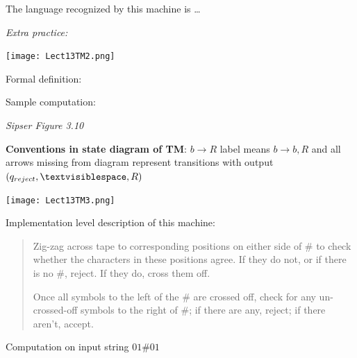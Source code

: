 \documentclass[12pt, oneside]{article}
\begin{document}
\vfill

The language recognized by this machine is \ldots

{\it Extra practice:}

 \texttt{[image: Lect13TM2.png]} 


 Formal definition: 


 Sample computation: 
 

\newpage
{\it Sipser Figure  3.10}

{\bf Conventions in state diagram of TM}: $b \to R$ label means $b \to b, R$ and
all arrows missing from diagram represent transitions with output $(q_{reject}, \textvisiblespace , R)$

\begin{multicols}{2}
\vspace{-20pt}
\begin{center}
\texttt{[image: Lect13TM3.png]}
\end{center}

Implementation level description of this machine:
\begin{quote}
Zig-zag across tape to corresponding positions on either side of $\#$ to check whether the 
characters in these positions agree. If they do not, or if there is no $\#$, reject. If they 
do, cross them off.

Once all symbols to the left of the $\#$ are crossed off, check for any un-crossed-off symbols 
to the right of $\#$; if there are any, reject; if there aren't, accept.
\end{quote}

\columnbreak

Computation on  input  string  $01\#01$


\end{multicols}
\end{document}
